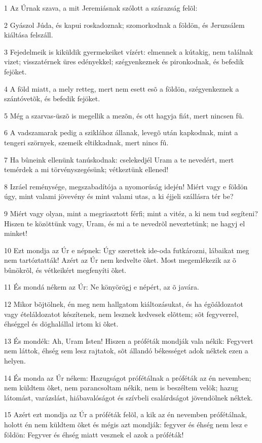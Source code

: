 \par 1 Az Úrnak szava, a mit Jeremiásnak szólott a szárazság felõl:
\par 2 Gyászol Júda, és kapui roskadoznak; szomorkodnak a földön, és Jeruzsálem kiáltása felszáll.
\par 3 Fejedelmeik is kiküldik gyermekeiket vízért: elmennek a kútakig, nem találnak vizet; visszatérnek üres edényekkel; szégyenkeznek és pironkodnak, és  befedik fejöket.
\par 4 A föld miatt, a mely retteg, mert nem esett esõ a földön, szégyenkeznek a szántóvetõk, és befedik fejöket.
\par 5 Még a szarvas-üszõ is megellik a mezõn, és ott hagyja fiát, mert nincsen fû.
\par 6 A vadszamarak pedig a sziklához állanak, levegõ után kapkodnak, mint a tengeri szörnyek, szemeik eltikkadnak, mert nincs fû.
\par 7 Ha bûneink ellenünk tanúskodnak: cselekedjél Uram a te nevedért, mert temérdek  a mi törvényszegésünk; vétkeztünk ellened!
\par 8 Izráel reménysége, megszabadítója a nyomorúság idején! Miért vagy e földön úgy, mint valami jövevény és mint valami utas, a ki éjjeli szállásra tér be?
\par 9 Miért vagy olyan, mint a megriasztott férfi; mint a vitéz, a ki nem tud segíteni? Hiszen te közöttünk vagy, Uram, és mi a te nevedrõl neveztetünk; ne hagyj el minket!
\par 10 Ezt mondja az Úr e népnek: Úgy szerettek ide-oda futkározni, lábaikat meg nem tartóztatták! Azért az Úr nem kedvelte õket. Most megemlékezik az  õ bûnökrõl, és vétkeikért megfenyíti õket.
\par 11 És mondá nékem az Úr: Ne könyörögj e népért, az õ javára.
\par 12 Mikor bõjtölnek, én meg nem hallgatom kiáltozásukat, és ha égõáldozatot vagy ételáldozatot készítenek, nem lesznek kedvesek elõttem; sõt fegyverrel, éhséggel és döghalállal irtom ki õket.
\par 13 És mondék: Ah, Uram Isten! Hiszen a próféták mondják vala nékik: Fegyvert nem láttok, éhség sem lesz rajtatok, sõt állandó békességet adok néktek ezen a helyen.
\par 14 És monda az Úr nékem: Hazugságot prófétálnak a próféták az én nevemben; nem küldtem õket, nem parancsoltam nékik, nem is beszéltem velök; hazug látomást, varázslást, hiábavalóságot és szívbeli csalárdságot jövendölnek néktek.
\par 15 Azért ezt mondja az Úr a próféták felõl, a kik az én nevemben prófétálnak, holott én nem küldtem õket és mégis azt mondják: fegyver és éhség nem lesz e földön: Fegyver és éhség miatt vesznek el azok a próféták!

